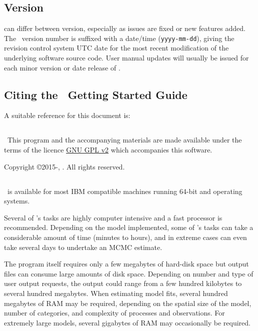 \subsection{Version\label{sec:version}}

\CNAME can differ between version, especially as issues are fixed or new features added. The \CNAME\ version number is suffixed with a date/time (\texttt{yyyy-mm-dd}), giving the revision control system UTC date for the most recent modification of the underlying software source code. User manual updates will usually be issued for each minor version or date release of \CNAME.

\subsection{Citing the \CNAME\ Getting Started Guide}
A suitable reference for this document is: 

\ManualRef{}
 
\subsection{}
\
This program and the accompanying materials are made available under the terms of the licence \href{http://www.gnu.org/licenses/old-licenses/gpl-2.0.en.html}{GNU GPL v2} which accompanies this software.

Copyright \copyright 2015-\SourceControlYearDoc, \href{http://www.niwa.co.nz}{\Organisation}. All rights reserved.

\subsection{}

\CNAME\ is available for most IBM compatible machines running 64-bit  and  operating systems.

Several of \CNAME's tasks are highly computer intensive and a fast processor is recommended. Depending on the model implemented, some of \CNAME's tasks can take a considerable amount of time (minutes to hours), and in extreme cases can even take several days to undertake an MCMC estimate. 

The program itself requires only a few megabytes of hard-disk space but output files can consume large amounts of disk space. Depending on number and type of user output requests, the output could range from a few hundred kilobytes to several hundred megabytes. When estimating model fits, several hundred megabytes of RAM may be required, depending on the spatial size of the model, number of categories, and complexity of processes and observations. For extremely large models, several gigabytes of RAM may occasionally be required. 

